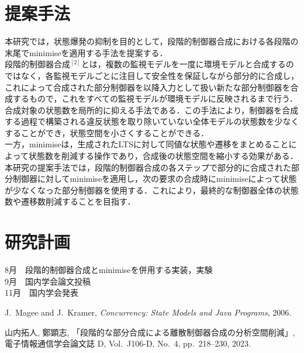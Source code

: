 \documentclass[11pt]{jarticle}
\begin{document}
\section{提案手法}
本研究では，状態爆発の抑制を目的として，段階的制御器合成における各段階の末尾でminimiseを適用する手法を提案する．\\
\indent
段階的制御器合成$^{[2]}$とは，複数の監視モデルを一度に環境モデルと合成するのではなく，各監視モデルごとに注目して安全性を保証しながら部分的に合成し，これによって合成された部分制御器を以降入力として扱い新たな部分制御器を合成するもので，これをすべての監視モデルが環境モデルに反映されるまで行う．合成対象の状態数を局所的に抑える手法である．この手法により，制御器を合成する過程で構築される違反状態を取り除いていない全体モデルの状態数を少なくすることができ，状態空間を小さくすることができる．\\
\indent
一方，minimiseは，生成されたLTSに対して同値な状態や遷移をまとめることによって状態数を削減する操作であり，合成後の状態空間を縮小する効果がある．\\
\indent
本研究の提案手法では，段階的制御器合成の各ステップで部分的に合成された部分制御器に対してminimiseを適用し，次の要求の合成時にminimiseによって状態が少なくなった部分制御器を使用する．これにより，最終的な制御器全体の状態数や遷移数削減することを目指す．\\





\section{研究計画}
8月　段階的制御器合成とminimiseを併用する実装，実験\\
\indent
9月　国内学会論文投稿\\
\indent
11月　国内学会発表\\

\appendix %
\begin{thebibliography}{99} %

J.~Magee and J.~Kramer, 
{\it Concurrency: State Models and Java Programs}, 2006.

山内拓人, 鄭顕志, 
「段階的な部分合成による離散制御器合成の分析空間削減」, 
電子情報通信学会論文誌 D, Vol.~J106-D, No.~4, pp.~218--230, 2023.

\end{thebibliography} %
\end{document}

